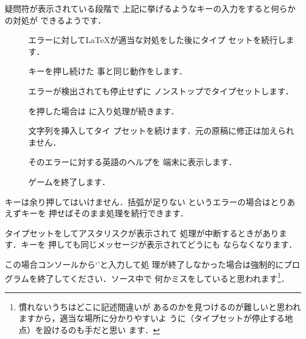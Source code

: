 {{{{{疑問符が表示されている段階で
上記に挙げるようなキーの入力をすると何らかの対処が
できるようです．
\begin{description}
 \item[] 
   エラーに対して{\LaTeX}が適当な対処をした後にタイプ
   セットを続行します．
 \item[] キーを押し続けた
事と同じ動作をします．
 \item[] エラーが検出されても停止せずに
ノンストップでタイプセットします． 
 \item[] を押した場合は
に入り処理が続きます． 
 \item[ ]  文字列を挿入してタイ
プセットを続けます．元の原稿に修正は加えられません．
 \item[] そのエラーに対する英語のヘルプを
端末に表示します．
 \item[] ゲームを終了します． 
\end{description}

%
キーは余り押してはいけません．括弧が足りない
というエラーの場合はとりあえずキーを
押せばそのまま処理を続行できます．

タイプセットをしてアスタリスク\qu{\str{*}}が表示されて
処理が中断するときがあります．キーを
押しても同じメッセージが表示されてどうにも
ならなくなります．%


この場合コンソールから`\verb||'と入力して処
理が終了しなかった場合は強制的にプログラムを終了してください．ソース中で
何かミスをしていると思われます\footnote{慣れないうちはどこに記述間違いが
あるのかを見つけるのが難しいと思われますから，適当な場所に分かりやすいよ
うに（タイプセットが停止する地点）を設けるのも手だと思い
ます．}．

}}}}}
